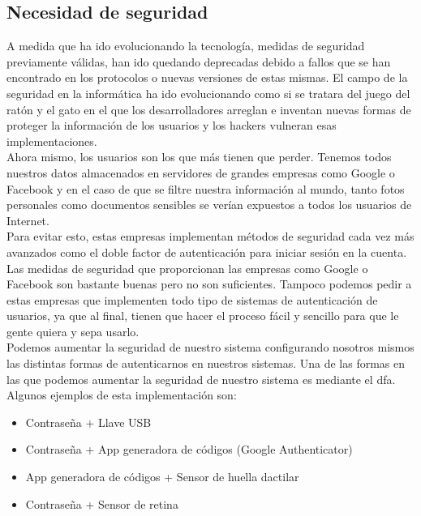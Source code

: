 \documentclass[titlepage, 12pt, a4paper]{article}
\begin{document}
\subsection{Necesidad de seguridad}
A medida que ha ido evolucionando la tecnología, medidas de seguridad previamente válidas, han ido quedando deprecadas debido a fallos que se han encontrado en los protocolos o nuevas versiones de estas mismas. El campo de la seguridad en la informática ha ido evolucionando como si se tratara del juego del ratón y el gato en el que los desarrolladores arreglan e inventan nuevas formas de proteger la información de los usuarios y los hackers vulneran esas implementaciones.\\Ahora mismo, los usuarios son los que más tienen que perder. Tenemos todos nuestros datos almacenados en servidores de grandes empresas como Google o Facebook y en el caso de que se filtre nuestra información al mundo, tanto fotos personales como documentos sensibles se verían expuestos a todos los usuarios de Internet.\\Para evitar esto, estas empresas implementan métodos de seguridad cada vez más avanzados como el doble factor de autenticación para iniciar sesión en la cuenta.\\Las medidas de seguridad que proporcionan las empresas como Google o Facebook son bastante buenas pero no son suficientes. Tampoco podemos pedir a estas empresas que implementen todo tipo de sistemas de autenticación de usuarios, ya que al final, tienen que hacer el proceso fácil y sencillo para que le gente quiera y sepa usarlo.\\Podemos aumentar la seguridad de nuestro sistema configurando nosotros mismos las distintas formas de autenticarnos en nuestros sistemas. Una de las formas en las que podemos aumentar la seguridad de nuestro sistema es mediante el \Gls{dfa}. Algunos ejemplos de esta implementación son:
\begin{itemize}
	\item Contraseña + Llave USB
	\item Contraseña + App generadora de códigos (Google Authenticator)
	\item App generadora de códigos + Sensor de huella dactilar
	\item Contraseña + Sensor de retina
\end{itemize}
\end{document}
